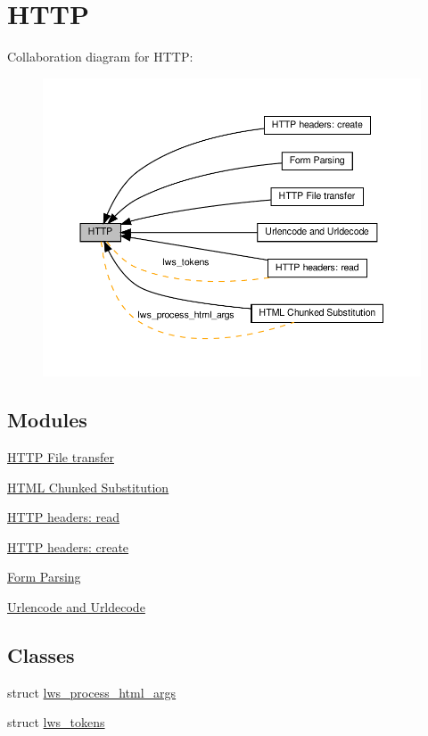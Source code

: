 \hypertarget{group__http}{}\section{H\+T\+TP}
\label{group__http}
Collaboration diagram for H\+T\+TP\+:
\nopagebreak
\begin{figure}[H]
\begin{center}
\leavevmode
\includegraphics[width=350pt]{group__http}
\end{center}
\end{figure}
\subsection*{Modules}
\begin{DoxyCompactItemize}
\item 
\hyperlink{group__httpft}{H\+T\+T\+P File transfer}
\item 
\hyperlink{group__html-chunked-substitution}{H\+T\+M\+L Chunked Substitution}
\item 
\hyperlink{group__HTTP-headers-read}{H\+T\+T\+P headers\+: read}
\item 
\hyperlink{group__HTTP-headers-create}{H\+T\+T\+P headers\+: create}
\item 
\hyperlink{group__form-parsing}{Form Parsing}
\item 
\hyperlink{group__urlendec}{Urlencode and Urldecode}
\end{DoxyCompactItemize}
\subsection*{Classes}
\begin{DoxyCompactItemize}
\item 
struct \hyperlink{structlws__process__html__args}{lws\+\_\+process\+\_\+html\+\_\+args}
\item 
struct \hyperlink{structlws__tokens}{lws\+\_\+tokens}
\end{DoxyCompactItemize}

